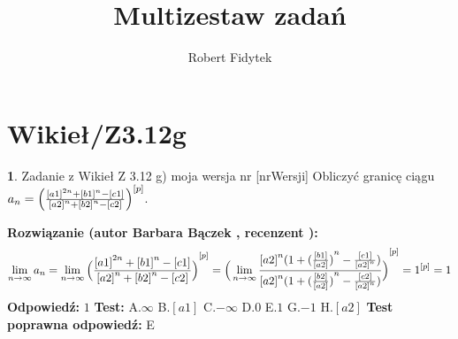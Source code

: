 \documentclass[12pt, a4paper]{article}
\title{Multizestaw zadań}
\author{Robert Fidytek}
\date{}
\theoremstyle{definition} %
\newtheorem{zad}{}
\newcommand{\kategoria}[1]{\section{#1}} %
\newcommand{\zadStart}[1]{\begin{zad}#1\newline} %
\newcommand{\zadStop}{\end{zad}}   %
\newcommand{\rozwStart}[2]{\noindent \textbf{Rozwiązanie (autor #1 , recenzent #2): }\newline} %
\newcommand{\rozwStop}{\newline}                                            %
\newcommand{\odpStart}{\noindent \textbf{Odpowiedź:}\newline}    %
\newcommand{\odpStop}{\newline}                                             %
\newcommand{\testStart}{\noindent \textbf{Test:}\newline} %
\newcommand{\testStop}{\newline} %
\newcommand{\kluczStart}{\noindent \textbf{Test poprawna odpowiedź:}\newline} %
\newcommand{\kluczStop}{\newline} %
\begin{document}
\maketitle


\kategoria{Wikieł/Z3.12g}
\zadStart{Zadanie z Wikieł Z 3.12 g) moja wersja nr [nrWersji]}
Obliczyć granicę ciągu $a_n={\Big{(}\frac{{[a1]}^{2n}+{[b1]}^n -[c1]}{{[a2]}^n + {[b2]}^n -[c2]}\Big{)}}^{[p]}$.
\zadStop
\rozwStart{Barbara Bączek}{}
$$\lim_{n \rightarrow \infty} a_n= \lim_{n \rightarrow \infty} {\Big{(}\frac{{[a1]}^{2n}+{[b1]}^n -[c1]}{{[a2]}^n + {[b2]}^n -[c2]}\Big{)}}^{[p]}= {\Big{(} \lim_{n \rightarrow \infty} \frac{{[a2]}^n (1 + {(\frac{[b1]}{[a2]})}^n - \frac{[c1]}{{[a2]}^n})}{{[a2]}^n (1 + {(\frac{[b2]}{[a2]})}^n - \frac{[c2]}{{[a2]}^n})} \Big{)}}^{[p]}= 1^{[p]}=1$$ 
\rozwStop
\odpStart
$1$
\odpStop
\testStart
A.$\infty$
B.$[a1]$
C.$-\infty$
D.$0$
E.$1$
G.$-1$
H.$[a2]$
\testStop
\kluczStart
E
\kluczStop
\end{document}
